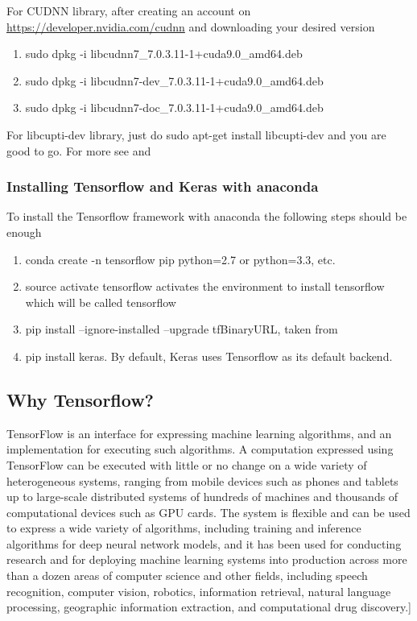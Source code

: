 \documentclass[a4paper,11pt]{article}
\begin{document}
	For CUDNN library, after creating an account on
	\url{https://developer.nvidia.com/cudnn}​ and downloading your desired version
	\begin{enumerate}
		\item sudo dpkg -i libcudnn7_7.0.3.11-1+cuda9.0_amd64.deb
		\item sudo dpkg -i libcudnn7-dev_7.0.3.11-1+cuda9.0_amd64.deb
		\item sudo dpkg -i libcudnn7-doc_7.0.3.11-1+cuda9.0_amd64.deb
	\end{enumerate}
	For libcupti-dev library, just do sudo apt-get install libcupti-dev and you are
	good to go.
	For more see \cite{cuddnGuide} and \cite{cuddnLinux}	
 
	\subsubsection{Installing Tensorflow and Keras with anaconda}
	To install the Tensorflow framework with anaconda the following steps should be enough
	\begin{enumerate}
		\item conda create -n tensorflow pip python=2.7 or python=3.3, etc.
		\item source activate tensorflow activates the environment to install
		tensorflow which will be called tensorflow
		\item pip install --ignore-installed --upgrade tfBinaryURL, taken from \cite{tensorflowBinary}
		\item pip install keras. By default, Keras uses Tensorflow as its default backend.
	\end{enumerate}

\subsection{Why Tensorflow?}
 TensorFlow is an interface for expressing machine learning algorithms, and an implementation for executing such algorithms. A computation expressed using TensorFlow can be executed with little or no change on a wide variety of heterogeneous systems, ranging from mobile devices such as phones and tablets up to large-scale distributed systems of hundreds of machines and thousands of computational devices such as GPU cards. The system is flexible and can be used to express a wide variety of algorithms, including training and inference algorithms for deep neural network models, and it has been used for conducting research and for deploying machine learning systems into production across more than a dozen areas of computer science and other fields, including speech recognition, computer vision, robotics, information retrieval, natural language processing, geographic information extraction, and computational drug discovery.\cite{tensorflowAbstract}] 
 
\end{document}
